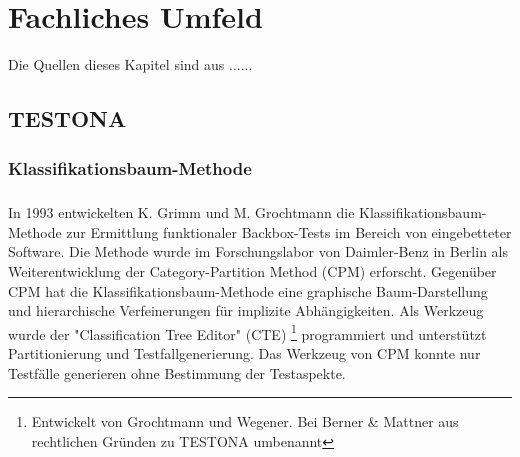 \chapter{Fachliches Umfeld}\label{chp:fachlichesumfeld}
Die Quellen dieses Kapitel sind aus ......

\section{TESTONA}\label{sec:Testona} 
\paragraph{}



\subsection{Klassifikationsbaum-Methode}
\paragraph{}
In 1993 entwickelten K. Grimm und M. Grochtmann die Klassifikationsbaum-Methode zur Ermittlung funktionaler Backbox-Tests im Bereich von eingebetteter Software. Die Methode wurde im Forschungslabor von Daimler-Benz in Berlin als Weiterentwicklung der Category-Partition Method (CPM) erforscht. Gegenüber CPM hat die Klassifikationsbaum-Methode eine graphische Baum-Darstellung und hierarchische Verfeinerungen für implizite Abhängigkeiten. Als Werkzeug wurde der "Classification Tree Editor" (CTE) \footnote{Entwickelt von Grochtmann und Wegener\cite{TestCaseDesign}. Bei Berner  \& Mattner aus rechtlichen Gründen zu TESTONA umbenannt} programmiert und unterstützt Partitionierung und Testfallgenerierung. Das Werkzeug von CPM konnte nur Testfälle generieren ohne Bestimmung der Testaspekte\cite{ClassificationTrees}.


